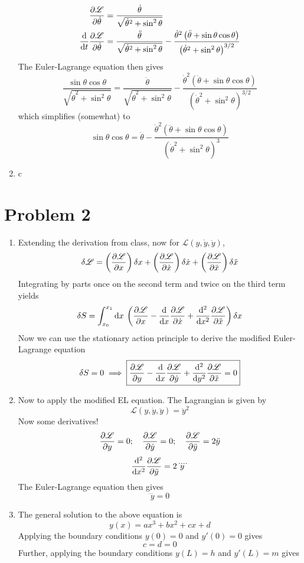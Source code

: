 \documentclass[12pt]{article}
\newcommand{\cint}[2]{\int_{#1}^{#2}}
\newcommand{\cintd}[3]{\cint{#1}{#2}\dd#3\:}
\begin{document}
\begin{enumerate}[label=(\alph*)]
\begin{align*}
        \pdv{\mathscr{L}}{\dot{\theta}} &= \frac{\dot{\theta}}{\sqrt{\dot{\theta}^2 + \sin^2\theta}} \\
        \dv{t}\pdv{\mathscr{L}}{\dot{\theta}} &= \frac{\ddot{\theta}}{\sqrt{\dot{\theta}^2 + \sin^2\theta}} - \frac{\dot{\theta}^2\left(\ddot{\theta} + \sin\theta\cos\theta\right)}{\left(\dot{\theta}^2 + \sin^2\theta\right)^{3/2}} 
    \end{align*}
    The Euler-Lagrange equation then gives
    \[ \frac{\sin\theta\cos\theta}{\sqrt{\dot{\theta}^2 + \sin^2\theta}} = \frac{\ddot{\theta}}{\sqrt{\dot{\theta}^2 + \sin^2\theta}} - \frac{\dot{\theta}^2\left(\ddot{\theta} + \sin\theta\cos\theta\right)}{\left(\dot{\theta}^2 + \sin^2\theta\right)^{3/2}} \]
    which simplifies (somewhat) to
    \[ \boxed{ \sin\theta\cos\theta = \ddot{\theta} - \frac{\dot{\theta}^2(\ddot{\theta} + \sin\theta\cos\theta)}{\left(\dot{\theta}^2 + \sin^2\theta\right)^3}} \]
    \item c
\end{enumerate}

\section*{Problem 2}
\begin{enumerate}[label=(\alph*)]
    \item Extending the derivation from class, now for $\mathscr{L}(y, \dot{y}, \ddot{y})$, 
    \[ \delta\mathscr{L} = \left(\pdv{\mathscr{L}}{x}\right)\delta x + \left(\pdv{\mathscr{L}}{\dot{x}}\right)\delta\dot{x} + \left(\pdv{\mathscr{L}}{\ddot{x}}\right)\delta\ddot{x} \]
    Integrating by parts once on the second term and twice on the third term yields
    \[ \delta S = \cintd{x_0}{x_1}{x} \left(\pdv{\mathscr{L}}{x} - \dv{x}\pdv{\mathscr{L}}{\dot{x}} + \dv[2]{x}\pdv{\mathscr{L}}{\ddot{x}}\right)\delta x \]
    Now we can use the stationary action principle to derive the modified Euler-Lagrange equation
    \[ \delta S = 0 \implies \boxed{\pdv{\mathscr{L}}{y} - \dv{x}\pdv{\mathscr{L}}{\dot{y}} + \dv[2]{y}\pdv{\mathscr{L}}{\ddot{x}} = 0} \]
    
    \item Now to apply the modified EL equation. The Lagrangian is given by
    \[ \mathscr{L}(y, \dot{y}, \ddot{y}) = \ddot{y}^2 \]
    Now some derivatives!
    \[ \pdv{\mathscr{L}}{y} = 0; \quad \pdv{\mathscr{L}}{\dot{y}} = 0; \quad \pdv{\mathscr{L}}{\ddot{y}} = 2\ddot{y} \]
    \[ \dv[2]{x}\pdv{\mathscr{L}}{\ddot{y}} = 2\ddddot{y} \]
    The Euler-Lagrange equation then gives
    \[ \ddddot{y} = 0 \]

    \item The general solution to the above equation is
    \[ y(x) = ax^3 + bx^2 + cx + d \]
    Applying the boundary conditions $y(0) = 0$ and $y'(0) = 0$ gives
    \[ c = d = 0 \]
    Further, applying the boundary conditions $y(L) = h$ and $y'(L) = m$ gives
    \[  \]
\end{enumerate}
\end{document}
